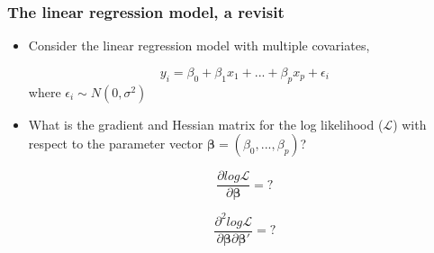 \documentclass[10pt]{beamer}
\begin{document}
\begin{frame}
\frametitle{The linear regression model, a revisit}
\begin{itemize}
\item Consider the linear regression model with multiple covariates,

  \begin{equation*}
    y_i = \beta_0 + \beta_1x_1+...+\beta_p x_p + \epsilon_i
  \end{equation*}
where $\epsilon_i \sim N(0, \sigma^2)$

\item What is the gradient and Hessian matrix for the log likelihood ($\mathcal{L}$)
  with respect to the parameter vector $\bm{\beta}=(\beta_0,...,\beta_p)$?

  \begin{equation*}
    \frac{\partial log \mathcal{L}}{\partial \bm{\beta}} = ?
  \end{equation*}

  \begin{equation*}
    \frac{\partial^2 log \mathcal{L}}{\partial \bm{\beta} \partial \bm{\beta}'}
    = ?
  \end{equation*}

\end{itemize}
\end{frame}
\end{document}
